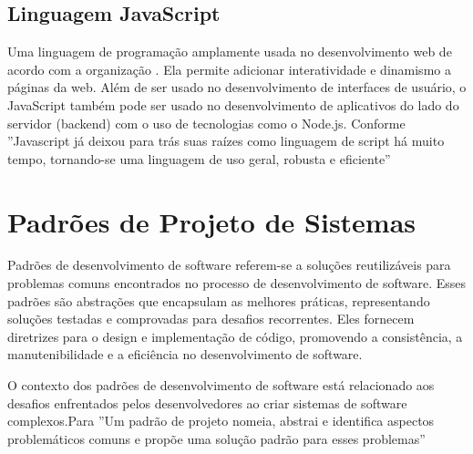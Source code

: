 \subsection{Linguagem JavaScript}
Uma linguagem de programação amplamente usada no desenvolvimento web de acordo com a organização \cite{mozillaJavaScript}. Ela permite adicionar interatividade e dinamismo a páginas da web. Além de ser usado no desenvolvimento de interfaces de usuário, o JavaScript também pode ser usado no desenvolvimento de aplicativos do lado do servidor (backend) com o uso de tecnologias como o Node.js. Conforme \cite{flanagan2012javascript} ''Javascript já deixou para trás suas raízes como linguagem de script há muito tempo, tornando-se uma linguagem de uso geral, robusta e eficiente''


\section{Padrões de Projeto de Sistemas}
Padrões de desenvolvimento de software referem-se a soluções reutilizáveis para problemas comuns encontrados no processo de desenvolvimento de software. Esses padrões são abstrações que encapsulam as melhores práticas, representando soluções testadas e comprovadas para desafios recorrentes. Eles fornecem diretrizes para o design e implementação de código, promovendo a consistência, a manutenibilidade e a eficiência no desenvolvimento de software.\cite{padroesProjeto}

O contexto dos padrões de desenvolvimento de software está relacionado aos desafios enfrentados pelos desenvolvedores ao criar sistemas de software complexos.Para \cite{padroesProjeto} ''Um padrão de projeto nomeia, abstrai e identifica aspectos problemáticos comuns e propõe uma solução padrão para esses problemas''


